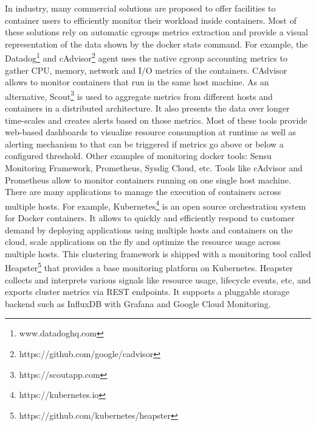 In industry, many commercial solutions are proposed to offer facilities to container users to efficiently monitor their workload inside containers. Most of these solutions rely on automatic cgroups metrics extraction and provide a visual representation of the data shown by the docker stats command. For example, the Datadog\footnote{www.datadoghq.com} and cAdvisor\footnote{https://github.com/google/cadvisor} agent uses the native cgroup accounting metrics to gather CPU, memory, network and I/O metrics of the containers. CAdvisor allows to monitor containers that run in the same host machine. As an alternative, Scout\footnote{https://scoutapp.com} is used to aggregate metrics from different hosts and containers in a distributed architecture. It also presents the data over longer time-scales and creates alerts based on those metrics. 
Most of these tools provide web-based dashboards to visualize resource consumption at runtime as well as alerting mechanism to that can be triggered if metrics go above or below a configured threshold. Other examples of monitoring docker tools: Sensu Monitoring Framework, Prometheus, Sysdig Cloud, etc.
Tools like cAdvisor and Prometheus allow to monitor containers running on one single host machine. 
There are many applications to manage the execution of containers across multiple hosts. For example, Kubernetes\footnote{https://kubernetes.io} is an open source orchestration system for Docker containers. It allows to quickly and efficiently respond to customer demand by deploying applications using multiple hosts and containers on the cloud, scale applications on the fly and optimize the resource usage across multiple hosts. This clustering framework is shipped with a monitoring tool called Heapster\footnote{https://github.com/kubernetes/heapster} that provides a base monitoring platform on Kubernetes. Heapster collects and interprets various signals like resource usage, lifecycle events, etc, and exports cluster metrics via REST endpoints. It supports a pluggable storage backend such as InfluxDB with Grafana and Google Cloud Monitoring.


